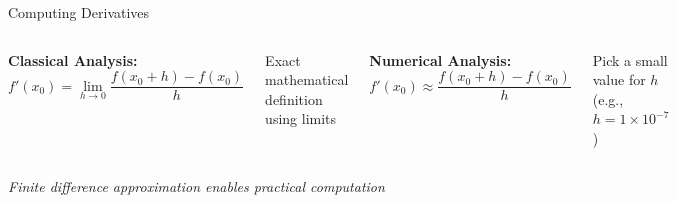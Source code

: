 \documentclass[aspectratio=169]{beamer}
\begin{document}
\begin{frame}{Computing Derivatives}
    \begin{columns}
        \textcolor{accentcolor}{\textbf{Classical Analysis:}}
        \begin{equation*}
            f'(x_{0}) = \lim_{h \to 0}\frac{f(x_{0} + h) - f(x_{0})}{h}
        \end{equation*}
        
        \vspace{1em}
        Exact mathematical definition using limits
        
        \textcolor{accentcolor}{\textbf{Numerical Analysis:}}
        \begin{equation*}
            f'(x_{0}) \approx \frac{f(x_{0} + h) - f(x_{0})}{h}
        \end{equation*}
        
        \vspace{1em}
        Pick a small value for $h$\\
        (e.g., $h = 1 \times 10^{-7}$)
    \end{columns}
    
    \vspace{1em}
    \begin{center}
    \textcolor{primarycolor}{\small\textit{Finite difference approximation enables practical computation}}
    \end{center}
\end{frame}
\end{document}
